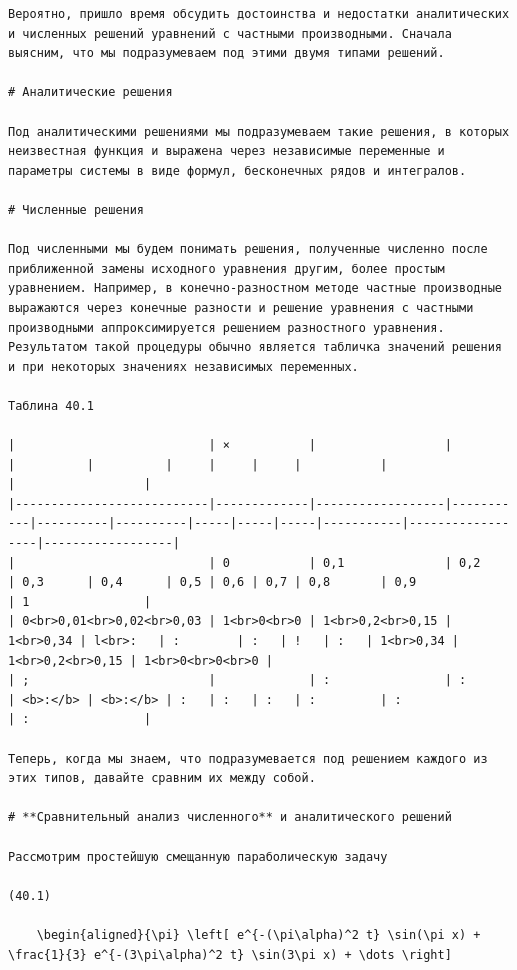 \documentclass[
  ukrainian,
]{article}
\begin{document}
\begin{verbatim}
Вероятно, пришло время обсудить достоинства и недостатки аналитических и численных решений уравнений с частными производными. Сначала выясним, что мы подразумеваем под этими двумя типами решений.

# Аналитические решения

Под аналитическими решениями мы подразумеваем такие решения, в которых неизвестная функция и выражена через независимые переменные и параметры системы в виде формул, бесконечных рядов и интегралов.

# Численные решения

Под численными мы будем понимать решения, полученные численно после приближенной замены исходного уравнения другим, более простым уравнением. Например, в конечно-разностном методе частные производные выражаются через конечные разности и решение уравнения с частными производными аппроксимируется решением разностного уравнения. Результатом такой процедуры обычно является табличка значений решения и при некоторых значениях независимых переменных.

Таблина 40.1

|                           | ×           |                  |           |          |          |     |     |     |           |                  |                  |
|---------------------------|-------------|------------------|-----------|----------|----------|-----|-----|-----|-----------|------------------|------------------|
|                           | 0           | 0,1              | 0,2       | 0,3      | 0,4      | 0,5 | 0,6 | 0,7 | 0,8       | 0,9              | 1                |
| 0<br>0,01<br>0,02<br>0,03 | 1<br>0<br>0 | 1<br>0,2<br>0,15 | 1<br>0,34 | l<br>:   | :        | :   | !   | :   | 1<br>0,34 | 1<br>0,2<br>0,15 | 1<br>0<br>0<br>0 |
| ;                         |             | :                | :         | <b>:</b> | <b>:</b> | :   | :   | :   | :         | :                | :                |

Теперь, когда мы знаем, что подразумевается под решением каждого из этих типов, давайте сравним их между собой.

# **Сравнительный анализ численного** и аналитического решений

Рассмотрим простейшую смещанную параболическую задачу

(40.1) 

    \begin{aligned}{\pi} \left[ e^{-(\pi\alpha)^2 t} \sin(\pi x) + \frac{1}{3} e^{-(3\pi\alpha)^2 t} \sin(3\pi x) + \dots \right]


\end{verbatim}
\end{document}
